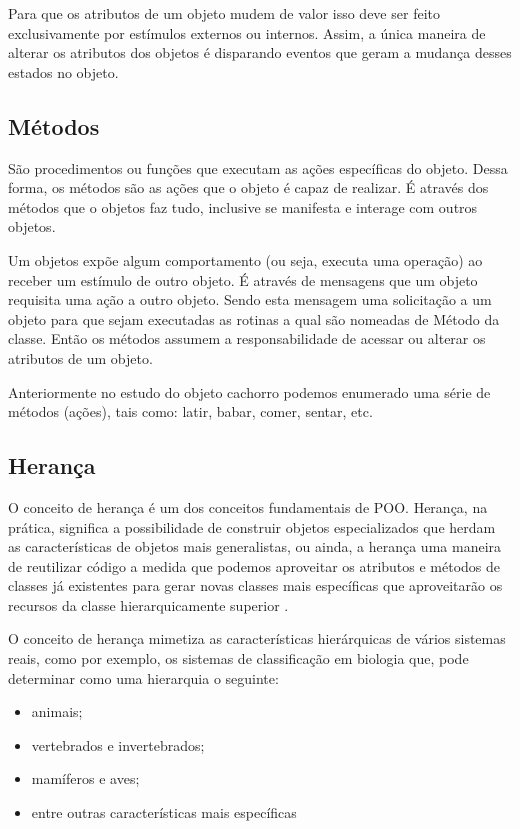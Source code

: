 Para que os atributos de um objeto mudem de valor isso deve ser feito  exclusivamente por estímulos externos ou internos. Assim, a única maneira  de alterar os atributos dos objetos é disparando eventos que geram a mudança desses estados no objeto.

\subsection{Métodos}

São procedimentos ou funções que executam as ações específicas do objeto. 
Dessa forma, os métodos são as ações que o objeto é capaz de realizar. É 
através dos métodos que o objetos faz tudo, inclusive se manifesta e 
interage com outros objetos.

Um objetos expõe algum comportamento (ou seja, executa uma operação) ao 
receber um estímulo de outro objeto. É através de mensagens que um objeto 
requisita uma ação a outro objeto. Sendo esta mensagem uma solicitação a um 
objeto para que sejam executadas as rotinas a qual são nomeadas de Método da 
classe. Então os métodos assumem a responsabilidade de acessar ou alterar os 
atributos de um objeto.

Anteriormente no estudo do objeto cachorro podemos enumerado uma série de métodos (ações), tais como: latir, babar, comer, sentar, etc.

\subsection{Herança}\label{subsection:heranca}

O conceito de herança é um dos conceitos fundamentais de POO. Herança, na prática, significa a possibilidade de construir objetos especializados que herdam as características de objetos mais generalistas, ou ainda, a herança uma maneira de reutilizar código a medida que podemos aproveitar os atributos e métodos de classes já existentes para gerar novas classes mais específicas que aproveitarão os recursos da classe hierarquicamente superior \cite{evandroeduardoseronruiz2008}.

O conceito de herança mimetiza as características hierárquicas de vários sistemas reais, como por exemplo, os sistemas de classificação em biologia que, pode determinar como uma hierarquia o seguinte:

\begin{itemize}
    \item animais;
    \item vertebrados e invertebrados;
    \item mamíferos e aves;
    \item entre outras características mais específicas
\end{itemize}

